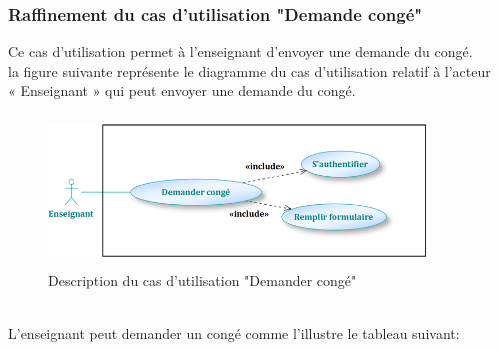 \documentclass[12 pt]{report}
\begin{document}
\subsubsection{Raffinement du cas d’utilisation "Demande congé"}
Ce cas d'utilisation permet à l'enseignant d'envoyer une demande du congé.\\

la figure suivante représente le diagramme du cas d’utilisation  relatif à l’acteur \\« Enseignant » qui peut envoyer une demande du congé.
\begin{figure}[h]
\begin{center}
\includegraphics[width= 10cm , height = 4cm]{enseignant3.png}
\caption{Description du cas d'utilisation "Demander congé"}
\end{center}
\end{figure}
\\
L’enseignant peut demander un congé comme l’illustre le tableau suivant:
\end{document}
